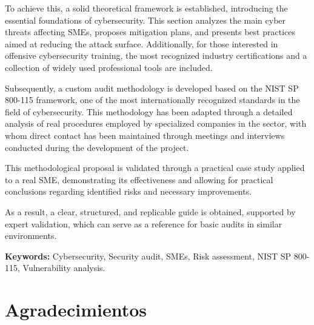\documentclass[a4paper, 11pt]{article}
\begin{document}
To achieve this, a solid theoretical framework is established, introducing the essential foundations of cybersecurity. This section analyzes the main cyber threats affecting SMEs, proposes mitigation plans, and presents best practices aimed at reducing the attack surface. Additionally, for those interested in offensive cybersecurity training, the most recognized industry certifications and a collection of widely used professional tools are included.

Subsequently, a custom audit methodology is developed based on the NIST SP 800-115 framework, one of the most internationally recognized standards in the field of cybersecurity. This methodology has been adapted through a detailed analysis of real procedures employed by specialized companies in the sector, with whom direct contact has been maintained through meetings and interviews conducted during the development of the project.

This methodological proposal is validated through a practical case study applied to a real SME, demonstrating its effectiveness and allowing for practical conclusions regarding identified risks and necessary improvements.

As a result, a clear, structured, and replicable guide is obtained, supported by expert validation, which can serve as a reference for basic audits in similar environments.

\textbf{Keywords:} Cybersecurity, Security audit, SMEs, Risk assessment, NIST SP 800-115, Vulnerability analysis.
\clearpage


\thispagestyle{nohead}
\section*{Agradecimientos}
\end{document}
